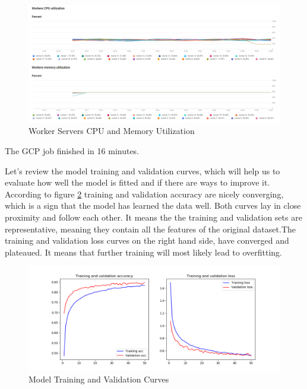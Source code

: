 \begin{Schunk}
\begin{figure}[H]

{\centering \includegraphics[width=1\linewidth]{../images/job_worker_cpu} 

}

\caption[Worker Servers CPU and Memory Utilization]{Worker Servers CPU and Memory Utilization}\label{fig:worker}
\end{figure}
\end{Schunk}

The GCP job finished in 16 minutes.

Let's review the model training and validation curves, which will help
us to evaluate how well the model is fitted and if there are ways to
improve it. According to figure \ref{fig:loss} training and validation
accuracy are nicely converging, which is a sign that the model has
learned the data well. Both curves lay in close proximity and follow
each other. It means the the training and validation sets are
representative, meaning they contain all the features of the original
dataset.The training and validation loss curves on the right hand side,
have converged and plateaued. It means that further training will most
likely lead to overfitting.

\begin{Schunk}
\begin{figure}[H]

{\centering \includegraphics[width=1\linewidth]{../images/Audio_DNN_train_val_curves} 

}

\caption[Model Training and Validation Curves]{Model Training and Validation Curves}\label{fig:loss}
\end{figure}
\end{Schunk}

